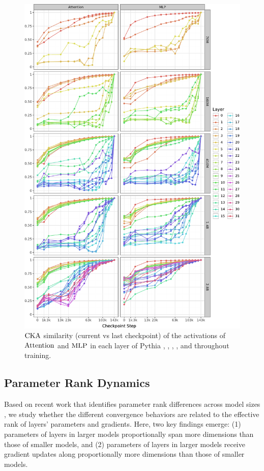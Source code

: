 \begin{figure}[h!]
    \centering
    \includegraphics[width=0.9\linewidth]{chapters/tending-towards-stability/figures/cka_full_lines.pdf}
    \vspace{-5pt}
    \caption{$\mathrm{CKA}$ similarity (current vs last checkpoint) of the activations of $\mathrm{Attention}$ and $\mathrm{MLP}$ in each layer of Pythia \sevenmil, \sixmil, \fourmil, \onebil, and \twobil throughout training.}%
    \label{fig:cka-layer-wise-lines}
\end{figure}
\clearpage

\subsection{Parameter Rank Dynamics}
\label{subsec:parameter-rank-dynamics}

Based on recent work that identifies parameter rank differences across model sizes \citep{godey2024small}, we study whether the different convergence behaviors are related to the effective rank of layers' parameters and gradients. Here, two key findings emerge: (1) parameters of layers in larger models proportionally span more dimensions than those of smaller models, and (2) parameters of layers in larger models receive gradient updates along proportionally more dimensions than those of smaller models.


